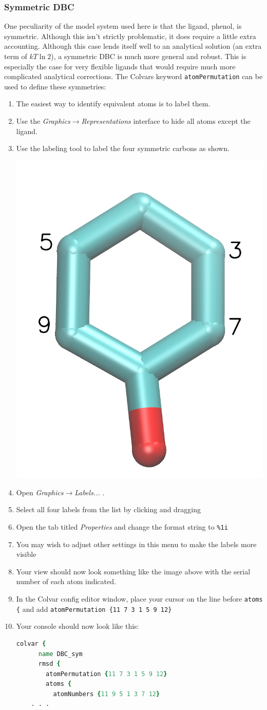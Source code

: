 \documentclass[9pt,tutorial]{Styling/livecoms}
\newcommand{\menu}[1]{
  \textit{#1}
}
\newcommand{\textInput}[1]{
  \texttt{#1}
}
\begin{document}
\subsubsection{Symmetric DBC}
\label{app:Symmetry}

One peculiarity of the model system used here is that the ligand, phenol, is symmetric. Although this isn't strictly problematic, it does require a little extra accounting. Although this case lends itself well to an analytical solution (an extra term of $kT\ln 2$), a symmetric DBC is much more general and robust.\cite{Ebrahimi2022} This is especially the case for very flexible ligands that would require much more complicated analytical corrections. The Colvars keyword \texttt{atomPermutation} can be used to define these symmetries:
\begin{enumerate}
     \item The easiest way to identify equivalent atoms is to label them.
     \item Use the \menu{Graphics$\rightarrow$Representations} interface to hide all atoms except the ligand.
     \item Use the labeling tool to label the four symmetric carbons as shown.
     
     \includegraphics[width=0.2\linewidth]{example_symmetry_labels.png}
     \item Open \menu{Graphics$\rightarrow$Labels...}.
     \item Select all four labels from the list by clicking and dragging
     \item Open the tab titled \menu{Properties} and change the format string to \textInput{\%1i}
     \item You may wish to adjust other settings in this menu to make the labels more visible
     \item Your view should now look something like the image above with the serial number of each atom indicated.
     \item In the Colvar config editor window, place your cursor on the line before \textInput{atoms \{} and add \textInput{atomPermutation \{11 7 3 1 5 9 12\}}
     \item Your console should now look like this:
    \begin{lstlisting}[language=tcl]
    colvar {
      name DBC_sym
      rmsd {
        atomPermutation {11 7 3 1 5 9 12}
        atoms {
          atomNumbers {11 9 5 1 3 7 12}
    . . .
    \end{lstlisting}
\end{enumerate}
\end{document}
